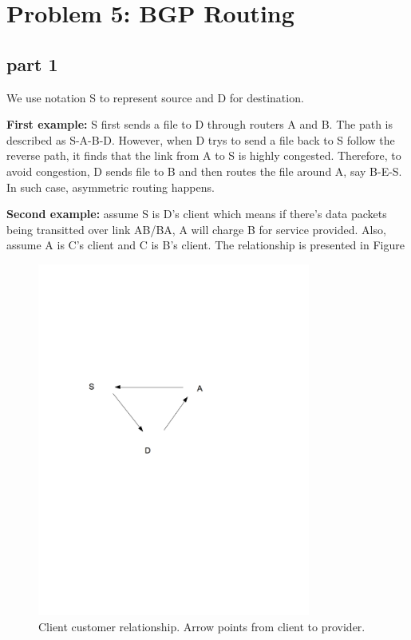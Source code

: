 \section{Problem 5: BGP Routing}
\subsection{part 1}

We use notation S to represent source and D for destination.

\textbf{First example:} S first sends a file to D through routers A and B. The path is described as S-A-B-D. However, when D trys to send a file back to S follow the reverse path, it finds that the link from A to S is highly congested. Therefore, to avoid congestion, D sends file to B and then routes the file around A, say B-E-S. In such case, asymmetric routing happens.

\textbf{Second example:} assume S is D's client which means if there's data packets being transitted over link AB/BA, A will charge B for service provided. Also, assume A is C's client and C is B's client. The relationship is presented in Figure

\begin{figure}[h]
    \centering
    \includegraphics[trim = 0 360 40 90mm, clip, width=0.8\textwidth]{p5.png}
    \caption{Client customer relationship. Arrow points from client to provider.}
    \label{fig:p5}
\end{figure}

